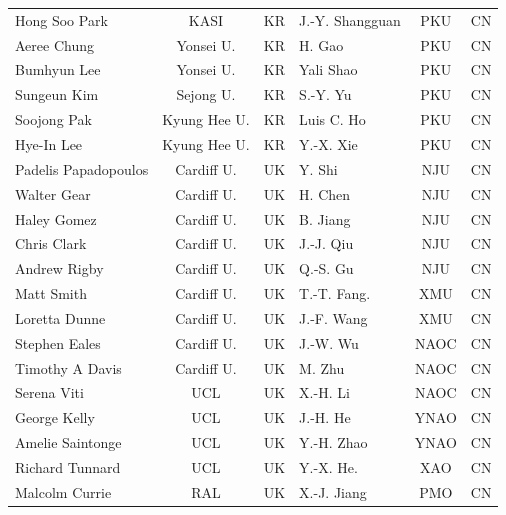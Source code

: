 \documentclass[legal,11pt]{article}
\begin{document}
\begin{table}[htbp]
\begin{threeparttable}[b]
\begin{tabular}{lcclcc}
Hong Soo Park        & KASI              & KR & J.-Y. Shangguan   & PKU           & CN \\
Aeree Chung          & Yonsei U.         & KR &  H. Gao           & PKU           & CN \\
Bumhyun Lee          & Yonsei U.         & KR & Yali Shao         & PKU           & CN \\
Sungeun Kim          & Sejong U.         & KR & S.-Y. Yu          & PKU           & CN \\
Soojong Pak          & Kyung Hee U.      & KR & Luis C. Ho        & PKU           & CN \\
Hye-In Lee           & Kyung Hee U.      & KR & Y.-X. Xie         & PKU           & CN \\
Padelis Papadopoulos & Cardiff U.        & UK & Y. Shi            & NJU           & CN \\ 
Walter Gear          & Cardiff U.        & UK & H. Chen           & NJU           & CN \\
Haley Gomez          & Cardiff U.        & UK & B. Jiang          & NJU           & CN \\
Chris Clark          & Cardiff U.        & UK & J.-J. Qiu         & NJU           & CN \\
Andrew Rigby         & Cardiff U.        & UK & Q.-S. Gu          & NJU           & CN \\
Matt Smith           & Cardiff U.        & UK & T.-T. Fang.       & XMU           & CN \\
Loretta Dunne        & Cardiff U.        & UK & J.-F. Wang        & XMU           & CN \\ 
Stephen Eales        & Cardiff U.        & UK & J.-W. Wu          & NAOC          & CN \\
Timothy A Davis      & Cardiff U.        & UK & M. Zhu            & NAOC          & CN \\
Serena Viti          & UCL               & UK & X.-H. Li          & NAOC          & CN \\
George Kelly         & UCL               & UK & J.-H. He          & YNAO          & CN \\
Amelie Saintonge     & UCL               & UK & Y.-H. Zhao        & YNAO          & CN \\
Richard Tunnard      & UCL               & UK & Y.-X. He.         & XAO           & CN \\
Malcolm Currie       & RAL               & UK & X.-J. Jiang       & PMO           & CN \\ 

\end{tabular}
\end{threeparttable}
\end{table}
\end{document}
